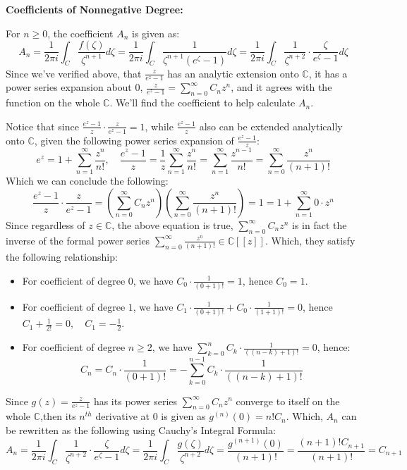\documentclass{article}
\begin{document}
\hfil

\hfil

\textbf{Coefficients of Nonnegative Degree:}

For $n\geq 0$, the coefficient $A_n$ is given as:
$$A_n=\frac{1}{2\pi i}\int_{C}\frac{f(\zeta)}{\zeta^{n+1}}d\zeta=\frac{1}{2\pi i}\int_{C}\frac{1}{\zeta^{n+1}(e^\zeta-1)}d\zeta = \frac{1}{2\pi i}\int_{C}\frac{1}{\zeta^{n+2}}\cdot \frac{\zeta}{e^\zeta-1}d\zeta$$
Since we've verified above, that $\frac{z}{e^z-1}$ has an analytic extension onto $\mathbb{C}$, it has a power series expansion about $0$, $\frac{z}{e^z-1}=\sum_{n=0}^{\infty}C_nz^n$, and it agrees with the function on the whole $\mathbb{C}$.
We'll find the coefficient to help calculate $A_n$.

Notice that since $\frac{e^z-1}{z}\cdot \frac{z}{e^z-1}=1$, while $\frac{e^z-1}{z}$ also can be extended analytically onto $\mathbb{C}$,
given the following power series expansion of $\frac{e^z-1}{z}$:
$$e^z=1+\sum_{n=1}^{\infty}\frac{z^n}{n!},\quad \frac{e^z-1}{z}=\frac{1}{z}\sum_{n=1}^{\infty}\frac{z^n}{n!}=\sum_{n=1}^{\infty}\frac{z^{n-1}}{n!}=\sum_{n=0}^{\infty}\frac{z^n}{(n+1)!}$$
Which we can conclude the following:
$$\frac{e^z-1}{z}\cdot \frac{z}{e^z-1}=\left(\sum_{n=0}^{\infty}C_nz^n\right)\left(\sum_{n=0}^{\infty}\frac{z^n}{(n+1)!}\right)=1 = 1 + \sum_{n=1}^{\infty}0\cdot z^n$$
Since regardless of $z\in\mathbb{C}$, the above equation is true, $\sum_{n=0}^{\infty}C_nz^n$ is in fact the inverse of the formal power series $\sum_{n=0}^{\infty}\frac{z^n}{(n+1)!}\in \mathbb{C}[[z]]$. Which, they satisfy the following relationship:
\begin{itemize}
    \item For coefficient of degree $0$, we have $C_0\cdot \frac{1}{(0+1)!}=1$, hence $C_0=1$.
    \item For coefficient of degree $1$, we have $C_1\cdot \frac{1}{(0+1)!}+C_0\cdot\frac{1}{(1+1)!}=0$, hence $C_1+\frac{1}{2!}=0,\quad C_1=-\frac{1}{2}$.
    \item For coefficient of degree $n\geq 2$, we have $\sum_{k=0}^{n}C_k\cdot \frac{1}{((n-k)+1)!}=0$, hence: 
    $$C_n=C_n\cdot\frac{1}{(0+1)!} = -\sum_{k=0}^{n-1}C_k\cdot\frac{1}{((n-k)+1)!}$$
\end{itemize}

\hfil

Since $g(z)=\frac{z}{e^z-1}$ has its power series $\sum_{n=0}^{\infty}C_nz^n$ converge to itself on the whole $\mathbb{C}$,then its $n^{th}$ derivative at $0$ is given as $g^{(n)}(0)=n!C_n$. Which, $A_n$ can be rewritten as the following using Cauchy's Integral Formula:
$$A_n=\frac{1}{2\pi i}\int_{C}\frac{1}{\zeta^{n+2}}\cdot\frac{\zeta}{e^\zeta-1}d\zeta=\frac{1}{2\pi i}\int_{C}\frac{g(\zeta)}{\zeta^{n+2}}d\zeta = \frac{g^{(n+1)}(0)}{(n+1)!}=\frac{(n+1)!C_{n+1}}{(n+1)!}=C_{n+1}$$
\end{document}
